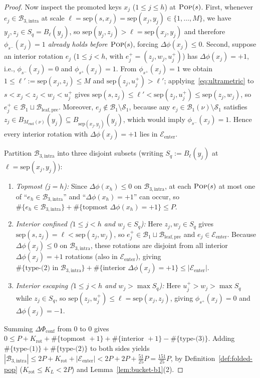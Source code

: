 \documentclass[11pt]{article}
\theoremstyle{definition}
\theoremstyle{remark}
\newcommand{\sep}{\mathrm{sep}}
\newcommand{\POP}{\textnormal{\scshape Pop}}
\begin{document}
\begin{proof}
Now inspect the promoted keys $x_j$ ($1 \le j \le h$) at $\POP(s)$. First, whenever $e_j \in \mathcal{B}_{3,\mathrm{intra}}$ at scale $\ell = \sep(s, x_j) = \sep(x_j, y_j) \in \{1, \dots, M\}$, we have $y_j, z_j \in S_q = B_\ell(y_j)$, so $\sep(y_j, z_j) > \ell = \sep(x_j, y_j)$ and therefore \emph{$\phi_{s^-}(x_j) = 1$ already holds before $\POP(s)$}, forcing $\Delta\phi(x_j) \le 0$. Second, suppose an interior rotation $e_j$ ($1 \le j < h$, with $e_j^+ = (z_j, w_j, u_j^+)$) has $\Delta\phi(x_j) = +1$, i.e., $\phi_{s^-}(x_j) = 0$ and $\phi_{s^+}(x_j) = 1$. From $\phi_{s^+}(x_j) = 1$ we obtain $1 \le \ell' := \sep(x_j, z_j) \le M$ and $\sep(z_j, u_j^+) > \ell'$; applying~\eqref{eq:ultrametric} to $s < x_j < z_j < w_j < u_j^+$ gives $\sep(s, z_j) \le \ell' < \sep(z_j, u_j^+) \le \sep(z_j, w_j)$, so $e_j^+ \in \mathcal{B}_1 \sqcup \mathcal{B}_{\mathrm{leaf,pre}}$. Moreover, $e_j \notin \mathcal{B}_1 \setminus \mathcal{S}_1$, because any $e_j \in \mathcal{B}_1(\nu) \setminus \mathcal{S}_1$ satisfies $z_j \in B_{M_{\mathrm{end}}(\nu)}(y_j) \subseteq B_{\sep(x_j, y_j)}(y_j)$, which would imply $\phi_{s^-}(x_j) = 1$. Hence every interior rotation with $\Delta\phi(x_j) = +1$ lies in $\mathcal{E}_{\mathrm{enter}}$.

Partition $\mathcal{B}_{3,\mathrm{intra}}$ into three disjoint subsets (writing $S_q := B_\ell(y_j)$ at $\ell = \sep(x_j, y_j)$):
\begin{enumerate}[label=(\arabic*)]
  \item \emph{Topmost ($j = h$):} Since $\Delta\phi(x_h) \le 0$ on $\mathcal{B}_{3,\mathrm{intra}}$, at each $\POP(s)$ at most one of ``$e_h \in \mathcal{B}_{3,\mathrm{intra}}$'' and ``$\Delta\phi(x_h) = +1$'' can occur, so $\#\{e_h \in \mathcal{B}_{3,\mathrm{intra}}\} + \#\{\text{topmost } \Delta\phi(x_h) = +1\} \le P$.
  \item \emph{Interior confined ($1 \le j < h$ and $w_j \in S_q$):} Here $z_j, w_j \in S_q$ gives $\sep(s, z_j) = \ell < \sep(z_j, w_j)$, so $e_j^+ \in \mathcal{B}_1 \sqcup \mathcal{B}_{\mathrm{leaf,pre}}$ and $e_j \in \mathcal{E}_{\mathrm{enter}}$. Because $\Delta\phi(x_j) \le 0$ on $\mathcal{B}_{3,\mathrm{intra}}$, these rotations are disjoint from all interior $\Delta\phi(x_j) = +1$ rotations (also in $\mathcal{E}_{\mathrm{enter}}$), giving $\#\{\text{type-(2) in }\mathcal{B}_{3,\mathrm{intra}}\} + \#\{\text{interior } \Delta\phi(x_j) = +1\} \le |\mathcal{E}_{\mathrm{enter}}|$.
  \item \emph{Interior escaping ($1 \le j < h$ and $w_j > \max S_q$):} Here $u_j^+ > w_j > \max S_q$ while $z_j \in S_q$, so $\sep(z_j, u_j^+) \le \ell = \sep(x_j, z_j)$, giving $\phi_{s^+}(x_j) = 0$ and $\Delta\phi(x_j) = -1$.
\end{enumerate}
Summing $\Delta\Phi_{\mathrm{conf}}$ from $0$ to $0$ gives $0 \le P + K_{\mathrm{rot}} + \#\{\text{topmost } +1\} + \#\{\text{interior } +1\} - \#\{\text{type-(3)}\}$. Adding $\#\{\text{type-(1)}\} + \#\{\text{type-(2)}\}$ to both sides yields $|\mathcal{B}_{3,\mathrm{intra}}| \le 2P + K_{\mathrm{rot}} + |\mathcal{E}_{\mathrm{enter}}| < 2P + 2P + \frac{51}{25} P = \frac{151}{25} P$, by Definition~\ref{def:folded-pop} ($K_{\mathrm{rot}} \le K_L < 2P$) and Lemma~\ref{lem:bucket-b1}(2).
\end{proof}
\end{document}
